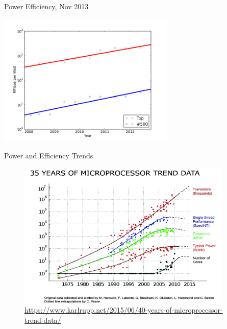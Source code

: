 \documentclass[xcolor=x11names,compress]{beamer}
\renewcommand{\(}{\begin{columns}}
\renewcommand{\)}{\end{columns}}
\newcommand{\<}[1]{\begin{column}{#1}}
\renewcommand{\>}{\end{column}}
\begin{document}
\begin{frame}{Power Efficiency, Nov 2013}

\begin{center}
\includegraphics[height=2.5in]{../figs/Green500evolution}
\end{center}

\end{frame}


\begin{frame}{Power and Efficiency Trends}

\begin{center}
\begin{figure}
\includegraphics[height=2.75in]{../figs/35years-processors}
\caption{\url{https://www.karlrupp.net/2015/06/40-years-of-microprocessor-trend-data/}}
\end{figure}
\end{center}

\end{frame}
\end{document}

